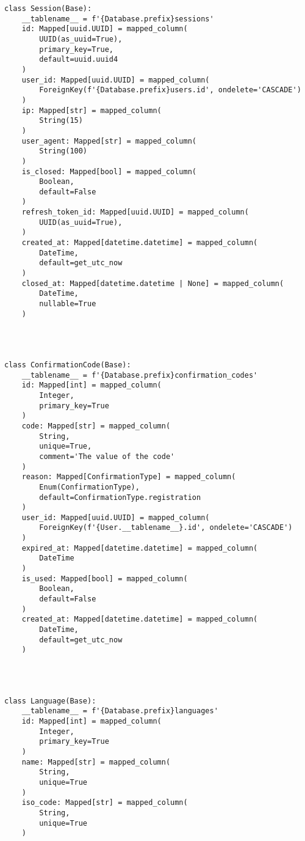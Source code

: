 \begin{lstlisting}
class Session(Base):
    __tablename__ = f'{Database.prefix}sessions'
    id: Mapped[uuid.UUID] = mapped_column(
        UUID(as_uuid=True),
        primary_key=True,
        default=uuid.uuid4
    )
    user_id: Mapped[uuid.UUID] = mapped_column(
        ForeignKey(f'{Database.prefix}users.id', ondelete='CASCADE')
    )
    ip: Mapped[str] = mapped_column(
        String(15)
    )
    user_agent: Mapped[str] = mapped_column(
        String(100)
    )
    is_closed: Mapped[bool] = mapped_column(
        Boolean,
        default=False
    )
    refresh_token_id: Mapped[uuid.UUID] = mapped_column(
        UUID(as_uuid=True),
    )
    created_at: Mapped[datetime.datetime] = mapped_column(
        DateTime,
        default=get_utc_now
    )
    closed_at: Mapped[datetime.datetime | None] = mapped_column(
        DateTime,
        nullable=True
    )




class ConfirmationCode(Base):
    __tablename__ = f'{Database.prefix}confirmation_codes'
    id: Mapped[int] = mapped_column(
        Integer,
        primary_key=True
    )
    code: Mapped[str] = mapped_column(
        String,
        unique=True,
        comment='The value of the code'
    )
    reason: Mapped[ConfirmationType] = mapped_column(
        Enum(ConfirmationType),
        default=ConfirmationType.registration
    )
    user_id: Mapped[uuid.UUID] = mapped_column(
        ForeignKey(f'{User.__tablename__}.id', ondelete='CASCADE')
    )
    expired_at: Mapped[datetime.datetime] = mapped_column(
        DateTime
    )
    is_used: Mapped[bool] = mapped_column(
        Boolean,
        default=False
    )
    created_at: Mapped[datetime.datetime] = mapped_column(
        DateTime,
        default=get_utc_now
    )




class Language(Base):
    __tablename__ = f'{Database.prefix}languages'
    id: Mapped[int] = mapped_column(
        Integer,
        primary_key=True
    )
    name: Mapped[str] = mapped_column(
        String,
        unique=True
    )
    iso_code: Mapped[str] = mapped_column(
        String,
        unique=True
    )





\end{lstlisting}
